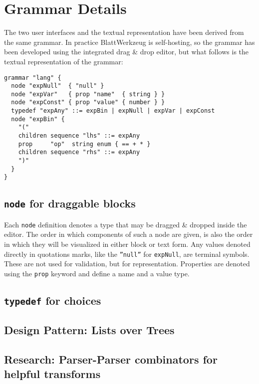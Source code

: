 \documentclass[runningheads]{llncs}
\begin{document}
\section{Grammar Details}

The two user interfaces and the textual representation have been derived from the same grammar. In practice BlattWerkzeug is self-hosting, so the grammar has been developed using the integrated drag \& drop editor, but what follows is the textual representation of the grammar:

\begin{lstlisting}[caption={Syntactic grammar for expression \texttt{expBin}}, label=lst:grammar-expr-expBin-syntax]
grammar "lang" {
  node "expNull"  { "null" }
  node "expVar"   { prop "name"  { string } }
  node "expConst" { prop "value" { number } }
  typedef "expAny" ::= expBin | expNull | expVar | expConst
  node "expBin" {
    "("
    children sequence "lhs" ::= expAny
    prop     "op"  string enum { == + * }
    children sequence "rhs" ::= expAny
    ")"
  }
}
\end{lstlisting}

\subsection{\texttt{node} for draggable blocks}

Each \texttt{node} definition denotes a type that may be dragged \& dropped inside the editor. The order in which components of such a node are given, is also the order in which they will be visualized in either block or text form. Any values denoted directly in quotations marks, like the \texttt{''null''} for \texttt{expNull}, are terminal symbols. These are not used for validation, but for representation. Properties are denoted using the \texttt{prop} keyword and define a name and a value type.

\subsection{\texttt{typedef} for choices}

\subsection{Design Pattern: Lists over Trees}

\subsection{Research: Parser-Parser combinators for helpful transforms}
\end{document}
